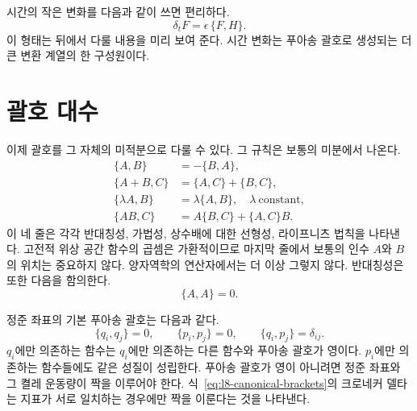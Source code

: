 \begin{classroomqa}  \end{classroomqa}

시간의 작은 변화를 다음과 같이 쓰면 편리하다. \begin{equation}
  \delta_t F=\epsilon\,\{F,H\}.
  \label{eq:l8-small-time-step}
\end{equation} 이 형태는 뒤에서 다룰 내용을 미리 보여 준다. 시간 변화는 푸아송 괄호로 생성되는 더 큰 변환 계열의 한 구성원이다.

\section{괄호 대수}

이제 괄호를 그 자체의 미적분으로 다룰 수 있다. 그 규칙은 보통의 미분에서 나온다. \begin{align}
  \{A,B\}&=-\{B,A\}, \label{eq:l8-antisymmetry}\\
  \{A+B,C\}&=\{A,C\}+\{B,C\}, \label{eq:l8-additivity}\\
  \{\lambda A,B\}&=\lambda\{A,B\},
    \quad \lambda\ \text{constant}, \label{eq:l8-scalar-rule}\\
  \{AB,C\}&=A\{B,C\}+\{A,C\}B. \label{eq:l8-leibniz}
\end{align} 이 네 줄은 각각 반대칭성, 가법성, 상수배에 대한 선형성, 라이프니츠 법칙을 나타낸다. 고전적 위상 공간 함수의 곱셈은 가환적이므로 마지막 줄에서 보통의 인수 \(A\)와 \(B\)의 위치는 중요하지 않다. 양자역학의 연산자에서는 더 이상 그렇지 않다. 반대칭성은 또한 다음을 함의한다. \begin{equation}
  \{A,A\}=0.
  \label{eq:l8-self-bracket}
\end{equation}

정준 좌표의 기본 푸아송 괄호는 다음과 같다.
\begin{equation}
  \boxed{
  \{q_i,q_j\}=0,\qquad
  \{p_i,p_j\}=0,\qquad
  \{q_i,p_j\}=\delta_{ij}.}
  \label{eq:l8-canonical-brackets}
\end{equation}
\(q_i\)에만 의존하는 함수는 \(q_i\)에만 의존하는 다른 함수와 푸아송 괄호가 영이다. \(p_i\)에만 의존하는 함수들에도 같은 성질이 성립한다. 푸아송 괄호가 영이 아니려면 정준 좌표와 그 켤레 운동량이 짝을 이루어야 한다. 식~\eqref{eq:l8-canonical-brackets}의 크로네커 델타는 지표가 서로 일치하는 경우에만 짝을 이룬다는 것을 나타낸다.

